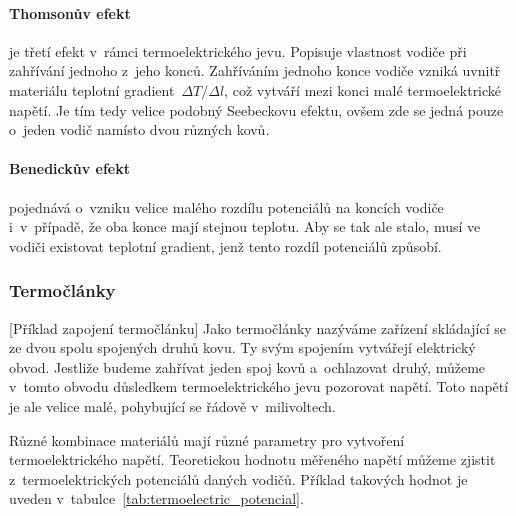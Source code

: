 \paragraph{Thomsonův efekt} je třetí efekt v~rámci termoelektrického jevu.
Popisuje vlastnost vodiče při zahřívání jednoho z~jeho konců. Zahříváním
jednoho konce vodiče vzniká uvnitř materiálu teplotní gradient~$\Delta T/\Delta l$, 
což vytváří mezi konci malé termoelektrické napětí. Je tím tedy velice
podobný Seebeckovu efektu, ovšem zde se jedná pouze o~jeden vodič namísto dvou
různých kovů.~\cite{jreichl-thomson}

\paragraph{Benedickův efekt} pojednává o~vzniku velice malého rozdílu
potenciálů na koncích vodiče i~v~případě, že oba konce mají stejnou teplotu.
Aby se tak ale stalo, musí ve vodiči existovat teplotní gradient, jenž tento
rozdíl potenciálů způsobí.~\cite{diplomka} 

\subsubsection{Termočlánky}
[Příklad zapojení termočlánku]
Jako termočlánky nazýváme zařízení skládající se ze dvou spolu spojených
druhů kovu. Ty svým spojením vytvářejí elektrický obvod. Jestliže budeme
zahřívat jeden spoj kovů a~ochlazovat druhý, můžeme v~tomto obvodu důsledkem
termoelektrického jevu pozorovat napětí. Toto napětí je ale velice malé, pohybující se řádově
v~milivoltech.


Různé kombinace materiálů mají různé parametry pro vytvoření termoelektrického 
napětí. Teoretickou hodnotu měřeného napětí můžeme zjistit z~termoelektrických
potenciálů daných vodičů. Příklad takových hodnot je uveden 
v~tabulce~\ref{tab:termoelectric_potencial}.

\newcommand{\phm}{\phantom{-}}

